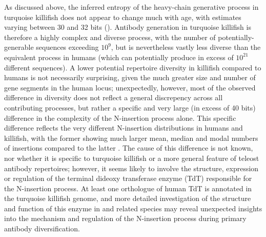 As discussed above, the inferred entropy of the heavy-chain generative process in turquoise killifish does not appear to change much with age, with estimates varying between 30 and 32 bits (). Antibody generation in turquoise killifish is therefore a highly complex and diverse process, with the number of potentially-generable sequences exceeding $10^9$, but is nevertheless  vastly less diverse than the equivalent process in humans (which can potentially produce in excess of $10^{21}$ different sequences). A lower potential repertoire diversity in killifish compared to humans is not necessarily surprising, given the much greater size and number of gene segments in the human \igh{} locus; unexpectedly, however, most of the observed difference in diversity does not reflect a general discrepency across all contributing processes, but rather a specific and very large (in excess of 40 bits) difference in the complexity of the N-insertion process alone. This specific difference reflects the very different N-insertion distributions in humans and killifish, with the former showing much larger mean, median and modal numbers of insertions compared to the latter \parencite{elhanati2015model}. The cause of this difference is not known, nor whether it is specific to turquoise killifish or a more general feature of teleost antibody repertoires; however, it seems likely to involve the structure, expression or regulation of the terminal dideoxy transferase enzyme (TdT) responsible for the N-insertion process. At least one orthologue of human TdT is annotated in the turquoise killifish genome, and more detailed investigation of the structure and function of this enzyme in \nfu and related species may reveal unexpected insights into the mechanism and regulation of the N-insertion process during primary antibody diversification.


